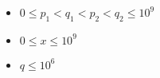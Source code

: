 \begin{itemize}
\tightlist
\item $0\le p_1 < q_1 < p_2 < q_2\le 10^9$
\item $0\le x \le 10^9$
\item $q\le 10^6$
\end{itemize}
